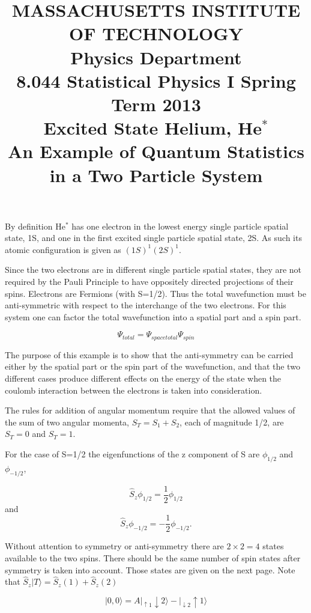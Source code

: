 \documentclass[12pt]{article}
\begin{document}
\title{MASSACHUSETTS INSTITUTE OF TECHNOLOGY \\
Physics Department \\
8.044 Statistical Physics I Spring Term 2013 \\
Excited State Helium, He$^*$ \\
An Example of Quantum Statistics in a Two Particle System}
\date{}
\maketitle

By definition He$^*$ has one electron in the lowest energy single particle spatial state, 1S, and one in the first excited single particle spatial state, 2S. As such its atomic configuration is given as $(1S)^1(2S)^1$.

Since the two electrons are in different single particle spatial states, they are not required by the Pauli Principle to have oppositely directed projections of their spins. Electrons are Fermions (with S=1/2). Thus the total wavefunction must be anti-symmetric with respect to the interchange of the two electrons. For this system one can factor the total wavefunction into a spatial part and a spin part.

\[
\Psi_{total} = \Psi_{spacetotal}\Psi_{spin}
\]

The purpose of this example is to show that the anti-symmetry can be carried either by the spatial part or the spin part of the wavefunction, and that the two different cases produce different effects on the energy of the state when the coulomb interaction between the electrons is taken into consideration.

The rules for addition of angular momentum require that the allowed values of the sum of two angular momenta, $S_T=S_1+S_2$, each of magnitude 1/2, are $S_T=0$ and $S_T=1$.

For the case of S=1/2 the eigenfunctions of the z component of S are $\phi_{1/2}$ and $\phi_{-1/2}$, 

\[
\hat{S}_z\phi_{1/2}=\frac{1}{2}\phi_{1/2}
\]
and
\[
\hat{S}_z\phi_{-1/2}=-\frac{1}{2}\phi_{-1/2}.
\]

Without attention to symmetry or anti-symmetry there are $2 \times 2 = 4$ states available to the two spins. There should be the same number of spin states after symmetry is taken into account. Those states are given on the next page. Note that $\hat{S}_z|T\rangle = \hat{S}_z(1) + \hat{S}_z(2)$

\[
| 0,0\rangle = A|_{\uparrow 1}\downarrow 2\rangle - |_{\downarrow 2}\uparrow 1\rangle
\]
\end{document}
